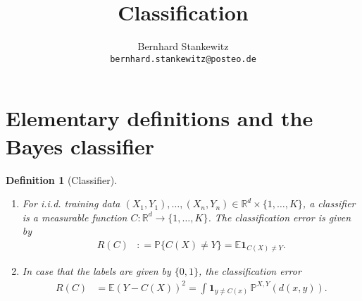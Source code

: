 \documentclass[a4paper,11pt]{article} %
\numberwithin{equation}{section}
\theoremstyle{ndefinition}
\newtheorem{defi}{Definition}[section]
\theoremstyle{nremark}
\theoremstyle{nplain}
\begin{document}
\title{Classification}
\author{Bernhard Stankewitz \\ \texttt{bernhard.stankewitz@posteo.de}}
\maketitle
{}
\tableofcontents

\section{Elementary definitions and the Bayes classifier}%
\label{sec:ElementaryDefinitionsAndTheBayesClassifier}

\begin{defi}[Classifier]%
  \label{def:Classifier}
  \
  \begin{enumerate}[label=(\alph*)]
    \item For i.i.d. training data \( ( X_{1}, Y_{1} ), \dots, ( X_{n}, Y_{n} )
      \in \mathbb{R}^{d} \times \{ 1, \dots, K \} \), a classifier is a
      measurable function \( C : \mathbb{R}^{d} \to \{ 1, \dots, K \} \). The
      classification error is given by
      \begin{align*}
        R(C) 
        & : = \mathbb{P} \{ C(X) \ne Y \} 
          =   \mathbb{E} \mathbf{1}_{C(X) \ne Y}. 
      \end{align*}
    \item In case that the labels are given by \( \{ 0, 1 \} \), the
      classification error 
      \begin{align*}
        R(C) 
        & = \mathbb{E} ( Y - C(X) )^{2} 
        = \int \mathbf{1}_{y \ne C(x)} \, \mathbb{P}^{X, Y}(d(x, y)). 
      \end{align*}
  \end{enumerate}
\end{defi}%
\end{document}
